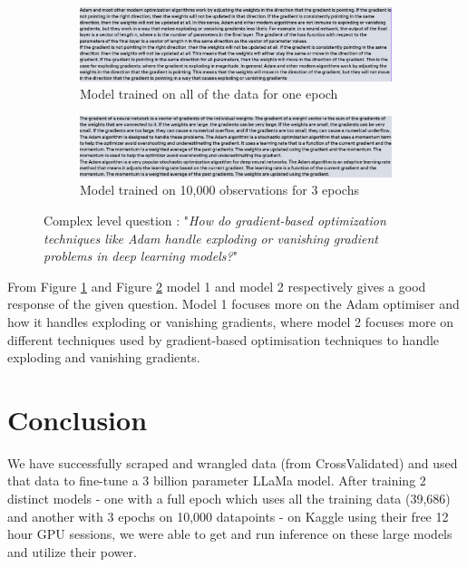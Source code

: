 \documentclass[10pt]{article}
\begin{document}
\begin{figure}[H]
    \centering
    \begin{subfigure}[b]{0.45\textwidth}
        \centering
        \includegraphics[width=\textwidth]{Images/1EpochQ3.png}
        \caption{Model trained on all of the data for one epoch}
        \label{fig: Q3_Model1}
    \end{subfigure}
    \hfill
    \begin{subfigure}[b]{0.5\textwidth}
        \centering
        \includegraphics[width=\textwidth]{Images/10kQ3.png}
        \caption{Model trained on 10,000 observations for 3 epochs}
        \label{fig: Q3_Model2}
    \end{subfigure}
    \caption{Complex level question : "\textit{How do gradient-based optimization techniques like Adam handle exploding or vanishing gradient problems in deep learning models?}"}
    \label{fig: Q3}
\end{figure}
From Figure \ref{fig: Q3_Model1} and Figure \ref{fig: Q3_Model2} model 1 and model 2 respectively
gives a good response of the given question. Model 1 focuses more on the Adam optimiser and how
it handles exploding or vanishing gradients, where
model 2 focuses more on different techniques used by gradient-based optimisation techniques
to handle exploding and vanishing gradients.   

\section{Conclusion}

We have successfully scraped and wrangled data (from CrossValidated)
and used that data to fine-tune a 3 billion parameter LLaMa model.
After training 2 distinct models - one with a full epoch which uses all the
training data (39,686) and another with 3 epochs on 10,000 datapoints - on
Kaggle using their free 12 hour GPU sessions, we were able to get and run
inference on these large models and utilize their power.
\end{document}
